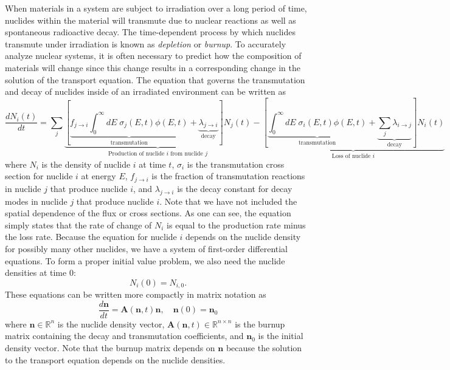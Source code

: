 \documentclass[3p,authoryear]{elsarticle}
\begin{document}
When materials in a system are subject to irradiation over a long period of
time, nuclides within the material will transmute due to nuclear reactions as
well as spontaneous radioactive decay. The time-dependent process by which
nuclides transmute under irradiation is known as \emph{depletion} or
\emph{burnup}. To accurately analyze nuclear systems, it is often necessary to
predict how the composition of materials will change since this change results
in a corresponding change in the solution of the transport equation. The
equation that governs the transmutation and decay of nuclides inside of an
irradiated environment can be written as
\begin{equation}
  \frac{dN_i(t)}{dt} = \sum\limits_j
  \underbrace{\left [ \underbrace{f_{j \rightarrow i} \int_0^\infty dE \;
  \sigma_j (E, t) \phi(E,t)}_\text{transmutation} +
  \underbrace{\lambda_{j\rightarrow i}}_\text{decay} \right ]
  N_j(t)}_{\text{Production of nuclide }i\text{ from nuclide }j}
  - \underbrace{\left [\underbrace{\int_0^\infty dE \; \sigma_i
  (E,t) \phi(E,t)}_\text{transmutation} +
  \underbrace{\sum\limits_j \lambda_{i\rightarrow j}}_\text{decay} \right ]
  N_i(t)}_{\text{Loss of nuclide }i}
\end{equation}
where $N_i$ is the density of nuclide $i$ at time $t$, $\sigma_i$ is the
transmutation cross section for nuclide $i$ at energy $E$, $f_{j \rightarrow i}$
is the fraction of transmutation reactions in nuclide $j$ that produce nuclide
$i$, and $\lambda_{j \rightarrow i}$ is the decay constant for decay modes in
nuclide $j$ that produce nuclide $i$. Note that we have not included the spatial
dependence of the flux or cross sections. As one can see, the equation simply
states that the rate of change of $N_i$ is equal to the production rate minus
the loss rate. Because the equation for nuclide $i$ depends on the nuclide
density for possibly many other nuclides, we have a system of first-order
differential equations. To form a proper initial value problem, we also need the
nuclide densities at time 0:
\begin{equation}
    N_i(0) = N_{i,0}.
\end{equation}
These equations can be written more compactly in matrix notation as
\begin{equation}
  \label{eq:depletion-matrix}
  \frac{d\mathbf{n}}{dt} = \mathbf{A}(\mathbf{n},t)\mathbf{n}, \quad \mathbf{n}(0) =
  \mathbf{n}_0
\end{equation}
where $\mathbf{n} \in \mathbb{R}^n$ is the nuclide density vector,
$\mathbf{A}(\mathbf{n},t) \in \mathbb{R}^{n\times n}$ is the burnup matrix
containing the decay and transmutation coefficients, and $\mathbf{n}_0$ is the
initial density vector. Note that the burnup matrix depends on $\mathbf{n}$
because the solution to the transport equation depends on the nuclide densities.
\end{document}
